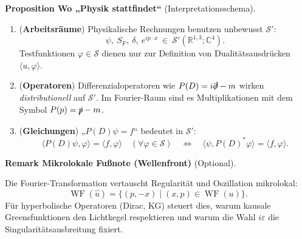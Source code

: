 \documentclass[10pt, letterpaper]{article}
\DeclareMathOperator{\WF}{WF}
\newcommand{\R}{\mathbb{R}}
\newcommand{\C}{\mathbb{C}}
\newcommand{\CustomHeading}[3]{%
  \par\medskip\noindent%
  \textbf{#1 #2} \textnormal{(#3)}.\enskip%
}
\newenvironment{PROP}[2]{\begin{unitbox}\CustomHeading{Proposition}{#1}{#2}}{\end{unitbox}}
\newenvironment{REM}[2]{\begin{unitbox}\CustomHeading{Remark}{#1}{#2}}{\end{unitbox}}
\begin{document}


\begin{PROP}{Wo „Physik stattfindet“}{Interpretationsschema}
\begin{enumerate}
\item (\textbf{Arbeitsräume}) Physikalische Rechnungen benutzen unbewusst $\mathcal{S}'$:
\[
\psi,\ S_F,\ \delta,\ e^{ip\cdot x}\ \in\ \mathcal{S}'(\R^{1,3};\C^4).
\]
Testfunktionen $\varphi\in\mathcal{S}$ dienen nur zur Definition von Dualitätsausdrücken $\langle u,\varphi\rangle$.

\item (\textbf{Operatoren}) Differenzialoperatoren wie $P(D)=i\slashed{\partial}-m$ wirken \emph{distributionell} auf $\mathcal{S}'$. Im Fourier-Raum sind es Multiplikationen mit dem Symbol $P(p)=\slashed{p}-m$.

\item (\textbf{Gleichungen}) „$P(D)\psi=f$“ bedeutet in $\mathcal{S}'$:
\[
\langle P(D)\psi,\varphi\rangle=\langle f,\varphi\rangle\quad(\forall\varphi\in\mathcal{S})
\quad\Longleftrightarrow\quad
\langle \psi,P(D)^\ast\varphi\rangle=\langle f,\varphi\rangle.
\]
\end{enumerate}
\end{PROP}




\begin{REM}{Mikrolokale Fußnote (Wellenfront)}{Optional}
Die Fourier-Transformation vertauscht Regularität und Oszillation mikrolokal:
\[
\WF(\hat u)=\{(p,-x)\mid (x,p)\in\WF(u)\}.
\]
Für hyperbolische Operatoren (Dirac, KG) steuert dies, warum kausale Greensfunktionen den Lichtkegel respektieren und warum die Wahl $i\varepsilon$ die Singularitätsausbreitung fixiert.
\end{REM}


\end{document}

